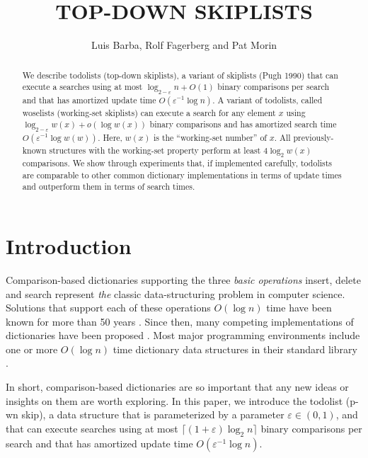 \documentclass[lotsofwhite]{patmorin}
\title{\MakeUppercase{Top-Down Skiplists}}
\author{Luis Barba, Rolf Fagerberg and Pat Morin}
\newcommand{\eps}{\varepsilon}
\begin{document}
\begin{titlepage}
\maketitle

\begin{abstract}
  We describe todolists (top-down skiplists), a variant of skiplists (Pugh
  1990) that can execute a searches using at most $\log_{2-\eps}
  n + O(1)$ binary comparisons per search and that has amortized update
  time $O(\eps^{-1}\log n)$.  A variant of todolists, called woselists
  (working-set skiplists) can execute a search for any element $x$ using
  $\log_{2-\eps} w(x) + o(\log w(x))$ binary comparisons and has amortized
  search time $O(\eps^{-1}\log w(w))$.  Here, $w(x)$ is
  the ``working-set number'' of $x$.  All previously-known structures with
  the working-set property perform at least $4\log_2 w(x)$ comparisons.
  We show through experiments that, if implemented carefully, todolists
  are comparable to other common dictionary implementations in terms of
  update times and outperform them in terms of search times.
\end{abstract}

\end{titlepage}

\section{Introduction}

Comparison-based dictionaries supporting the three \emph{basic operations}
insert, delete and search represent \emph{the} classic data-structuring
problem in computer science.  Solutions that support each of these
operations $O(\log n)$ time have been known for more than 50 years
\cite{avl}.  Since then, many competing implementations of dictionaries
have been proposed \cite{X}.  Most major programming environments include
one or more $O(\log n)$ time dictionary data structures in their standard
library \cite{S}.

In short, comparison-based dictionaries are so important that any
new ideas or insights on them are worth exploring.  In this paper,
we introduce the todolist (p-wn skip), a
data structure that is parameterized by a parameter $\eps\in(0,1)$,
and that can execute searches using at most $\lceil(1+\eps)\log_2
n\rceil$ binary comparisons per search and that has amortized update
time $O(\eps^{-1}\log n)$.
\end{document}
